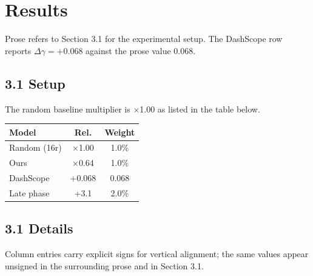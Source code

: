 \section{Results}
Prose refers to Section 3.1 for the experimental setup. The DashScope row
reports $\Delta\gamma{=}{+}0.068$ against the prose value 0.068.

\subsection{3.1 Setup}
The random baseline multiplier is $\times$1.00 as listed in the table below.

\begin{table}
\begin{tabular}{lcc}
\toprule
Model & Rel. & Weight \\
\midrule
Random (16r) & $\times$1.00 & 1.0\% \\
Ours & $\times$0.64 & 1.0\% \\
DashScope & +0.068 & 0.068 \\
Late phase & +3.1 & 2.0\% \\
\bottomrule
\end{tabular}
\end{table}

\subsection{3.1 Details}
Column entries carry explicit signs for vertical alignment; the same values
appear unsigned in the surrounding prose and in Section 3.1.
